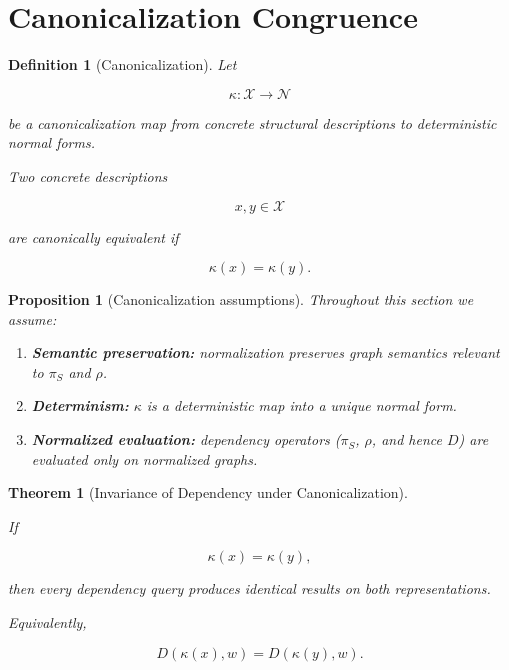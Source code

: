 \documentclass[11pt]{article}
\newtheorem{definition}{Definition}
\newtheorem{theorem}{Theorem}
\newtheorem{proposition}{Proposition}
\begin{document}
\section{Canonicalization Congruence}
\label{sec:canonicalization}
\begin{definition}[Canonicalization]

Let

\[
\kappa : \mathcal{X} \rightarrow \mathcal{N}
\]

be a canonicalization map from concrete structural descriptions
to deterministic normal forms.

Two concrete descriptions

\[
x,y \in \mathcal{X}
\]

are canonically equivalent if

\[
\kappa(x)=\kappa(y).
\]

\end{definition}
\begin{proposition}[Canonicalization assumptions]
\label{prop:canonicalization-assumptions}
Throughout this section we assume:
\begin{enumerate}[label=(C\arabic*),leftmargin=*]
  \item \textbf{Semantic preservation:} normalization preserves graph semantics relevant to $\pi_S$ and $\rho$.
  \item \textbf{Determinism:} $\kappa$ is a deterministic map into a unique normal form.
  \item \textbf{Normalized evaluation:} dependency operators ($\pi_S$, $\rho$, and hence $D$) are evaluated only on normalized graphs.
\end{enumerate}
\end{proposition}

\begin{theorem}[Invariance of Dependency under Canonicalization]
\label{thm:canonicalization}

If

\[
\kappa(x)=\kappa(y),
\]

then every dependency query produces identical results on both
representations.

Equivalently,

\[
D(\kappa(x),w)
=
D(\kappa(y),w).
\]

\end{theorem}
\end{document}
